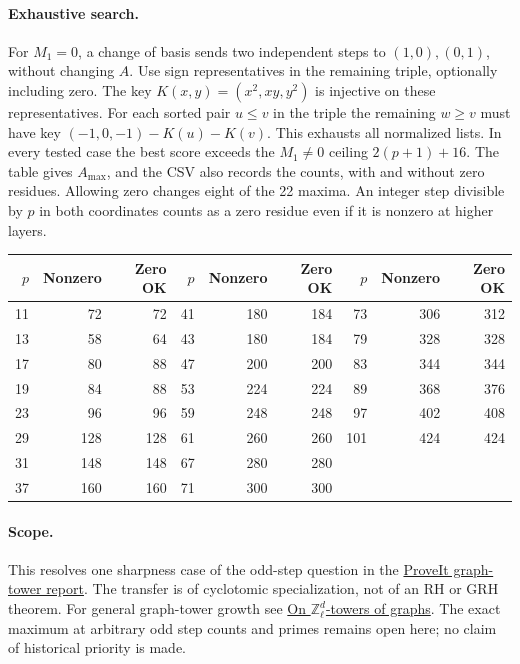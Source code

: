 \documentclass[11pt]{article}
\begin{document}
\paragraph{Exhaustive search.}
For $M_1=0$, a change of basis sends two independent steps to
$(1,0),(0,1)$, without changing $A$. Use sign representatives in
the remaining triple, optionally including zero. The key
$K(x,y)=(x^2,xy,y^2)$ is injective on these representatives.
For each sorted pair $u\le v$ in the triple the remaining $w\ge v$
must have key $(-1,0,-1)-K(u)-K(v)$. This exhausts all normalized
lists. In every tested case the best score exceeds the
$M_1\ne0$ ceiling $2(p+1)+16$.
The table gives $A_{\max}$, and the CSV also records the counts, with and without
zero residues. Allowing zero changes eight of the 22 maxima.
An integer step divisible by $p$ in both coordinates counts as
a zero residue even if it is nonzero at higher layers.

\begin{center}
\small
\begin{tabular}{r rr @{\qquad} r rr @{\qquad} r rr}
\toprule
$p$ & Nonzero & Zero OK & $p$ & Nonzero & Zero OK & $p$ & Nonzero & Zero OK\\
\midrule
11 & 72 & 72 & 41 & 180 & 184 & 73 & 306 & 312\\
13 & 58 & 64 & 43 & 180 & 184 & 79 & 328 & 328\\
17 & 80 & 88 & 47 & 200 & 200 & 83 & 344 & 344\\
19 & 84 & 88 & 53 & 224 & 224 & 89 & 368 & 376\\
23 & 96 & 96 & 59 & 248 & 248 & 97 & 402 & 408\\
29 & 128 & 128 & 61 & 260 & 260 & 101 & 424 & 424\\
31 & 148 & 148 & 67 & 280 & 280 &  &  & \\
37 & 160 & 160 & 71 & 300 & 300 &  &  & \\
\bottomrule
\end{tabular}
\end{center}
\paragraph{Scope.}
This resolves one sharpness case of the odd-step question in the
\href{https://github.com/VladimirReshetnikov/ProveIt/blob/21c0252ffe8611baa0fbf528fbb003d6c42ca9af/Analysis/GeneralizedRiemannHypothesis/Research/grh_transfers_lubin_tate_and_graph_towers/graphs.tex}{ProveIt graph-tower report}.
The transfer is of cyclotomic specialization, not of an RH or GRH
theorem. For general graph-tower growth see
\href{https://doi.org/10.5802/alco.304}{On $\mathbb Z_\ell^d$-towers of graphs}.
The exact maximum at arbitrary odd step counts and primes remains
open here; no claim of historical priority is made.
\end{document}
